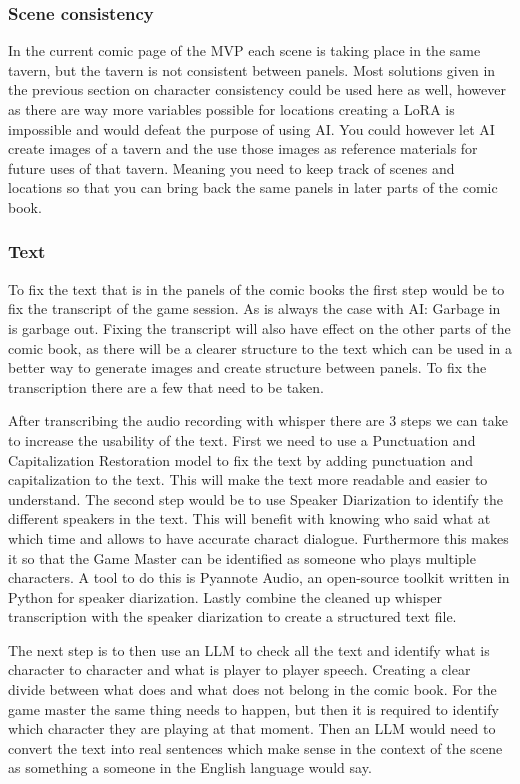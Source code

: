 \subsubsection{Scene consistency}
In the current comic page of the MVP each scene is taking place in the same tavern, but the tavern is not consistent between panels. Most solutions given in the previous section on character consistency could be used here as well, however as there are way more variables possible for locations creating a LoRA is impossible and would defeat the purpose of using AI. You could however let AI create images of a tavern and the use those images as reference materials for future uses of that tavern. Meaning you need to keep track of scenes and locations so that you can bring back the same panels in later parts of the comic book. 

\subsubsection{Text}
To fix the text that is in the panels of the comic books the first step would be to fix the transcript of the game session. As is always the case with AI: Garbage in is garbage out. Fixing the transcript will also have effect on the other parts of the comic book, as there will be a clearer structure to the text which can be used in a better way to generate images and create structure between panels. To fix the transcription there are a few that need to be taken.

After transcribing the audio recording with whisper there are 3 steps we can take to increase the usability of the text. First we need to use a Punctuation and Capitalization Restoration model to fix the text by adding punctuation and capitalization to the text. This will make the text more readable and easier to understand. The second step would be to use Speaker Diarization to identify the different speakers in the text. This will benefit with knowing who said what at which time and allows to have accurate charact dialogue. Furthermore this makes it so that the Game Master can be identified as someone who plays multiple characters. A tool to do this is Pyannote Audio, an open-source toolkit written in Python for speaker diarization. Lastly combine the cleaned up whisper transcription with the speaker diarization to create a structured text file.

The next step is to then use an LLM to check all the text and identify what is character to character and what is player to player speech. Creating a clear divide between what does and what does not belong in the comic book. For the game master the same thing needs to happen, but then it is required to identify which character they are playing at that moment. Then an LLM would need to convert the text into real sentences which make sense in the context of the scene as something a someone in the English language would say.

